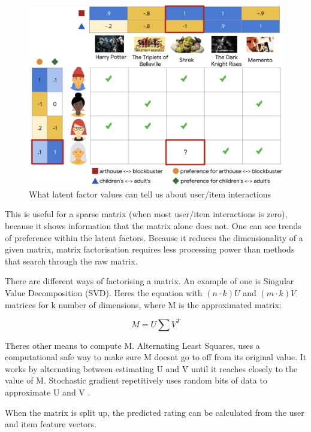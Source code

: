 \begin{figure}[H]
	\includegraphics[scale=0.45]{images/latent_factors}
	\centering
	\caption{What latent factor values can tell us about user/item interactions \citep{httpsdevelopersgooglecom_matrix_2023}} 
	\label{fig:figure}
\end{figure}

This is useful for a sparse matrix (when most user/item interactions is zero), because it shows information that the matrix alone does not.  One can see trends of preference within the latent factors. Because it reduces the dimensionality of a given matrix, matrix factorisation requires less processing power than methods that search through the raw matrix. 

There are different ways of factorising a matrix. An example of one is Singular Value Decomposition (SVD). Heres the equation with $(n\cdot k)U$ and $(m\cdot k)V$ matrices for k number of dimensions,  where M is the approximated matrix:

\begin{equation}
	M = U \sum V ^{T}
\end{equation}

Theres other means to compute M. Alternating Least Squares, uses a computational safe way to make sure M doesnt go to off from its original value. It works by alternating between estimating U and V until it reaches closely to the value of M. Stochastic gradient repetitively uses random bits of data to approximate U and V \citep{koren_matrix_2009}. 

When the matrix is split up, the predicted rating can be calculated from the user and item feature vectors. 

